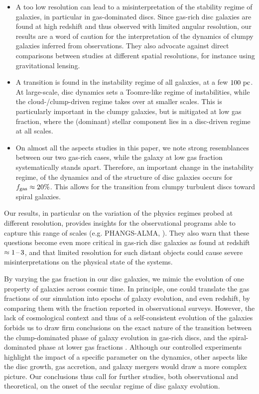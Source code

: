 \documentclass[useAMS,usenatbib]{mnras}
\newcommand{\fgas}{\ensuremath{f_{\rm gas}}\xspace}
\begin{document}
\begin{itemize}
\item A too low resolution can lead to a misinterpretation of the stability regime of galaxies, in particular in gas-dominated discs. Since gas-rich disc galaxies are found at high redshift and thus observed with limited angular resolution, our results are a word of caution for the interpretation of the dynamics of clumpy galaxies inferred from observations. They also advocate against direct comparisons between studies at different spatial resolutions, for instance using gravitational lensing.
\item A transition is found in the instability regime of all galaxies, at a few $100 \mathrm{~pc}$. At large-scale, disc dynamics sets a Toomre-like regime of instabilities, while the cloud-/clump-driven regime takes over at smaller scales. This is particularly important in the clumpy galaxies, but is mitigated at low gas fraction, where the (dominant) stellar component lies in a disc-driven regime at all scales.
\item On almost all the aspects studies in this paper, we note strong resemblances between our two gas-rich cases, while the galaxy at low gas fraction systematically stands apart. Therefore, an important change in the instability regime, of the dynamics and of the structure of disc galaxies occurs for $\fgas \approx 20\%$. This allows for the transition from clumpy turbulent discs toward spiral galaxies.
\end{itemize}

Our results, in particular on the variation of the physics regimes probed at different resolution, provides insights for the observational programs able to capture this range of scales (e.g. PHANGS-ALMA, \citealt{Leroy2021}). They also warn that these questions become even more critical in gas-rich disc galaxies as found at redshift $\approx 1\textrm{\,--\,} 3$, and that limited resolution for such distant objects could cause severe misinterpretations on the physical state of the systems.

By varying the gas fraction in our disc galaxies, we mimic the evolution of one property of galaxies across cosmic time. In principle, one could translate the gas fractions of our simulation into epochs of galaxy evolution, and even redshift, by comparing them with the fraction reported in observational surveys. However, the lack of cosmological context and thus of a self-consistent evolution of the galaxies forbids us to draw firm conclusions on the exact nature of the transition between the clump-dominated phase of galaxy evolution in gas-rich discs, and the spiral-dominated phase at lower gas fractions \citep[see also][]{Elmegreen2014}. Although our controlled experiments highlight the impact of a specific parameter on the dynamics, other aspects like the disc growth, gas accretion, and galaxy mergers would draw a more complex picture. Our conclusions thus call for further studies, both observational and theoretical, on the onset of the secular regime of disc galaxy evolution.
\end{document}

